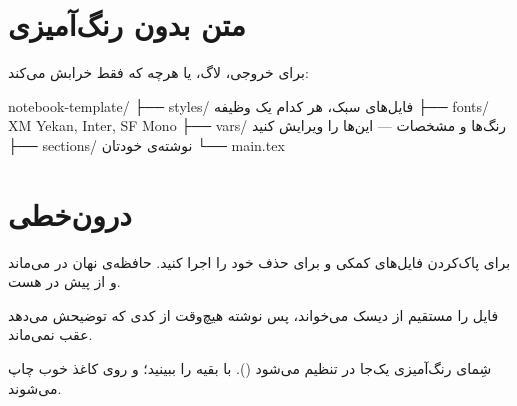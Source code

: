 \section{متن بدون رنگ‌آمیزی}

برای خروجی، لاگ، یا هرچه که  فقط خرابش می‌کند:

\begin{plaincode}
notebook-template/
├── styles/     فایل‌های سبک، هر کدام یک وظیفه
├── fonts/      XM Yekan, Inter, SF Mono
├── vars/       رنگ‌ها و مشخصات — این‌ها را ویرایش کنید
├── sections/   نوشته‌ی خودتان
└── main.tex
\end{plaincode}

\section{درون‌خطی}

برای پاک‌کردن فایل‌های کمکی  و برای حذف خود 
 را اجرا کنید. حافظه‌ی نهان  در
 می‌ماند و از پیش در  هست.

\begin{tip}
 فایل را
مستقیم از دیسک می‌خواند، پس نوشته هیچ‌وقت از کدی که توضیحش می‌دهد عقب
نمی‌ماند.
\end{tip}

\begin{note}
شِمای رنگ‌آمیزی یک‌جا در  تنظیم می‌شود
(). با  بقیه را
ببینید؛  و  روی کاغذ خوب چاپ می‌شوند.
\end{note}
